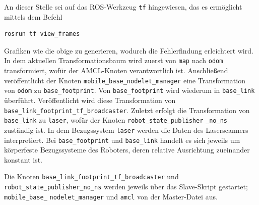 An dieser Stelle sei auf das ROS-Werkzeug \lstinline{tf}{} hingewiesen, das es ermöglicht mittels dem Befehl
\begin{lstlisting}
rosrun tf view_frames
\end{lstlisting}
Grafiken wie die obige zu generieren, wodurch die Fehlerfindung erleichtert wird. In dem aktuellen Transformationsbaum wird zuerst von \lstinline{map}{} nach \lstinline{odom}{} transformiert, wofür der AMCL-Knoten verantwortlich ist. Anschließend veröffentlicht der Knoten \lstinline{mobile_base_nodelet_manager}{} eine Transformation von \lstinline{odom}{} zu \lstinline{base_footprint}{}. Von \lstinline{base_footprint}{} wird wiederum in \lstinline{base_link}{} überführt. Veröffentlicht wird diese Transformation von \lstinline{base_link_footprint_tf_broadcaster}{}. Zuletzt erfolgt die Transformation von \lstinline{base_link}{} zu \lstinline{laser}{}, wofür der Knoten \lstinline{robot_state_publisher} \lstinline{_no_ns}{} zuständig ist. In dem Bezugssystem \lstinline{laser}{} werden die Daten des Laserscanners interpretiert. Bei \lstinline{base_footprint}{} und \lstinline{base_link}{} handelt es sich jeweils um körperfeste Bezugssysteme des Roboters, deren relative Ausrichtung zueinander konstant ist.

Die Knoten \lstinline{base_link_footprint_tf_broadcaster}{} und \lstinline{robot_state_}{}\linebreak  \lstinline{publisher_no_ns}{} werden jeweils über das Slave-Skript gestartet; \lstinline{mobile_base_}{} \lstinline{nodelet_manager}{} und \lstinline{amcl}{} von der Master-Datei aus.


